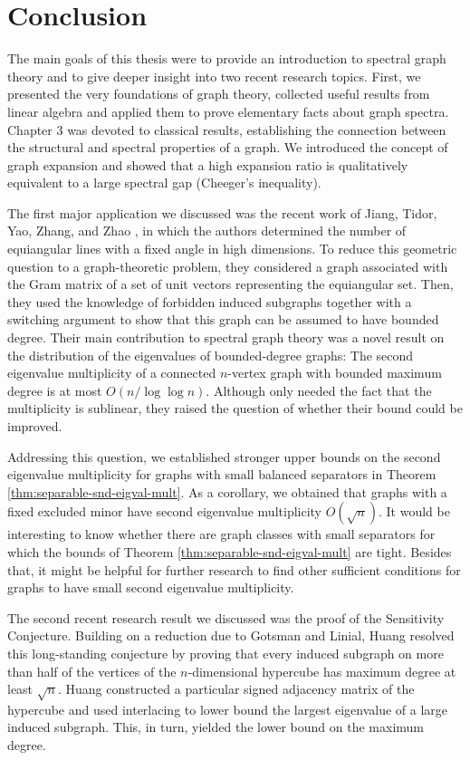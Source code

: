 \chapter{Conclusion}

The main goals of this thesis were to provide an introduction to spectral graph theory and to give deeper insight into two recent research topics.
First, we presented the very foundations of graph theory, collected useful results from linear algebra and applied them to prove elementary facts about graph spectra.
Chapter 3 was devoted to classical results, establishing the connection between the structural and spectral properties of a graph.
We introduced the concept of graph expansion and showed that a high expansion ratio is qualitatively equivalent to a large spectral gap (Cheeger's inequality).

The first major application we discussed was the recent work of Jiang, Tidor, Yao, Zhang, and Zhao \cite{equiangular}, in which the authors determined the number of equiangular lines with a fixed angle in high dimensions. 
To reduce this geometric question to a graph-theoretic problem, they considered a graph associated with the Gram matrix of a set of unit vectors representing the equiangular set.
Then, they used the knowledge of forbidden induced subgraphs together with a switching argument to show that this graph can be assumed to have bounded degree.
Their main contribution to spectral graph theory was a novel result on the distribution of the eigenvalues of bounded-degree graphs: 
The second eigenvalue multiplicity of a connected $n$-vertex graph with bounded maximum degree is at most $O(n / \log \log n)$.
Although \cite{equiangular} only needed the fact that the multiplicity is sublinear, they raised the question of whether their bound could be improved.

Addressing this question, we established stronger upper bounds on the second eigenvalue multiplicity for graphs with small balanced separators in Theorem \ref{thm:separable-snd-eigval-mult}.
As a corollary, we obtained that graphs with a fixed excluded minor have second eigenvalue multiplicity $O(\sqrt{n})$.
It would be interesting to know whether there are graph classes with small separators for which the bounds of Theorem \ref{thm:separable-snd-eigval-mult} are tight. 
Besides that, it might be helpful for further research to find other sufficient conditions for graphs to have small second eigenvalue multiplicity.

The second recent research result we discussed was the proof of the Sensitivity Conjecture. 
Building on a reduction due to Gotsman and Linial, Huang \cite{sensitivity} resolved this long-standing conjecture by proving that every induced subgraph on more than half of the vertices of the $n$-dimensional hypercube has maximum degree at least $\sqrt{n}$.
Huang constructed a particular signed adjacency matrix of the hypercube and used interlacing to lower bound the largest eigenvalue of a large induced subgraph. 
This, in turn, yielded the lower bound on the maximum degree.

